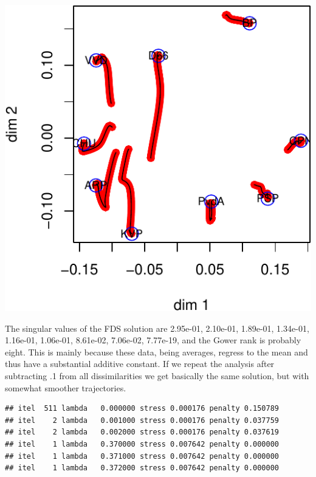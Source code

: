 \documentclass[
  12pt,
]{article}
\begin{document}
\begin{center}\includegraphics{penalty_files/figure-latex/poldist2-1} \end{center}

The singular values of the FDS solution are 2.95e-01, 2.10e-01,
1.89e-01, 1.34e-01, 1.16e-01, 1.06e-01, 8.61e-02, 7.06e-02, 7.77e-19,
and the Gower rank is probably eight. This is mainly because these data,
being averages, regress to the mean and thus have a substantial additive
constant. If we repeat the analysis after subtracting .1 from all
dissimilarities we get basically the same solution, but with somewhat
smoother trajectories.

\begin{verbatim}
## itel  511 lambda   0.000000 stress 0.000176 penalty 0.150789 
## itel    2 lambda   0.001000 stress 0.000176 penalty 0.037759 
## itel    2 lambda   0.002000 stress 0.000176 penalty 0.037619 
## itel    1 lambda   0.370000 stress 0.007642 penalty 0.000000 
## itel    1 lambda   0.371000 stress 0.007642 penalty 0.000000 
## itel    1 lambda   0.372000 stress 0.007642 penalty 0.000000
\end{verbatim}
\end{document}
